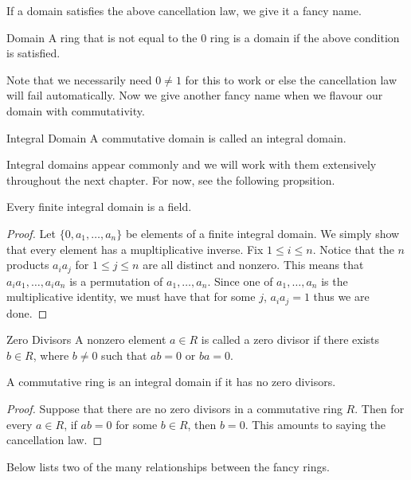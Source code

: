 \documentclass[a4paper]{article}
\begin{document}
If a domain satisfies the above cancellation law, we give it a fancy name. 

\begin{defn}{Domain}{} A ring that is not equal to the $0$ ring is a domain if the above condition is satisfied. 
\end{defn}

Note that we necessarily need $0\neq 1$ for this to work or else the cancellation law will fail automatically. Now we give another fancy name when we flavour our domain with commutativity. 

\begin{defn}{Integral Domain}{} A commutative domain is called an integral domain. 
\end{defn}

Integral domains appear commonly and we will work with them extensively throughout the next chapter. For now, see the following propsition. 

\begin{prp}{}{} Every finite integral domain is a field. \tcbline
\begin{proof}
Let $\{0,a_1,\dots,a_n\}$ be elements of a finite integral domain. We simply show that every element has a mupltiplicative inverse. Fix $1\leq i\leq n$. Notice that the $n$ products $a_ia_j$ for $1\leq j\leq n$ are all distinct and nonzero. This means that $a_ia_1,\dots,a_ia_n$ is a permutation of $a_1,\dots,a_n$. Since one of $a_1,\dots,a_n$ is the multiplicative identity, we must have that for some $j$, $a_ia_j=1$ thus we are done. 
\end{proof}
\end{prp}

\begin{defn}{Zero Divisors}{} A nonzero element $a\in R$ is called a zero divisor if there exists $b\in R$, where $b\neq 0$ such that $ab=0$ or $ba=0$. 
\end{defn}

\begin{prp}{}{} A commutative ring is an integral domain if it has no zero divisors. \tcbline
\begin{proof}
Suppose that there are no zero divisors in a commutative ring $R$. Then for every $a\in R$, if $ab=0$ for some $b\in R$, then $b=0$. This amounts to saying the cancellation law. 
\end{proof}
\end{prp}

Below lists two of the many relationships between the fancy rings. 
\end{document}
